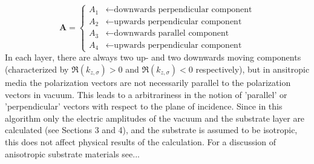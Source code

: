 \documentclass[11pt]{article}
\begin{document}
\begin{equation}
\mathbf{A}= \begin{cases}
 								A_1 &  \leftarrow \text{downwards perpendicular component} \\
 								A_2 & \leftarrow \text{upwards perpendicular component} \\
 								A_3 & \leftarrow \text{downwards parallel component} \\
 								A_4 & \leftarrow \text{upwards perpendicular component}
 \end{cases}
\end{equation}
In each layer, there are always two up- and two downwards moving components (characterized by $\Re(k_{z,\sigma})>0$ and $\Re(k_{z,\sigma})<0$ respectively), but in ansitropic media the polarization vectors are not necessarily parallel to the polarization vectors in vacuum. This leads to a arbitrariness in the notion of 'parallel' or 'perpendicular' vectors with respect to the plane of incidence. Since in this algorithm only the electric amplitudes of the vacuum  and the substrate layer are calculated (see Sections 3 and 4), and the substrate is assumed to be isotropic, this does not affect physical results of the calculation. For a discussion of anisotropic substrate materials see...
\end{document}
